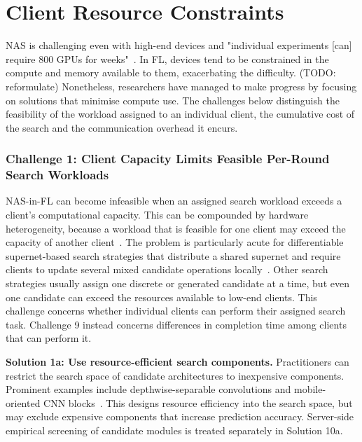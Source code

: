 \section{Client Resource Constraints}

NAS is challenging even with high-end devices and "individual experiments [can] require 800 GPUs for weeks"~\cite{TODO}. In FL, devices tend to be constrained in the compute and memory available to them, exacerbating the difficulty. (TODO: reformulate) Nonetheless, researchers have managed to make progress by focusing on solutions that minimise compute use. The challenges below distinguish the feasibility of the workload assigned to an individual client, the cumulative cost of the search and the communication overhead it encurs.

\subsubsection{Challenge 1: Client Capacity Limits Feasible Per-Round Search Workloads}

NAS-in-FL can become infeasible when an assigned search workload exceeds a client's computational capacity. This can be compounded by hardware heterogeneity, because a workload that is feasible for one client may exceed the capacity of another client~\cite{fedoras_2022,fednas_over_hetero_mobile_devices_2022,dfnas_2020,peaches_2024,supernet_trade-off_fednas_2025}. The problem is particularly acute for differentiable supernet-based search strategies that distribute a shared supernet and require clients to update several mixed candidate operations locally~\cite{fednas_2021,dp-fnas_2020,feathers_2023,fed_auto_mri_2023}. Other search strategies usually assign one discrete or generated candidate at a time, but even one candidate can exceed the resources available to low-end clients. This challenge concerns whether individual clients can perform their assigned search task. Challenge 9 instead concerns differences in completion time among clients that can perform it.

\noindent\textbf{Solution 1a: Use resource-efficient search components.} Practitioners can restrict the search space of candidate architectures to inexpensive components. Prominent examples include depthwise-separable convolutions and mobile-oriented CNN blocks~\cite{fed_auto_mri_2023,intrusion_detection_fednas_2024}. This designs resource efficiency into the search space, but may exclude expensive components that increase prediction accuracy. Server-side empirical screening of candidate modules is treated separately in Solution 10a.

